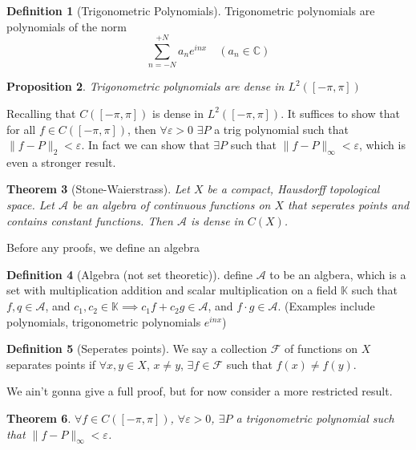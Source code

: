 \documentclass[13pt]{article}
\newtheorem{theorem}{Theorem}
\newtheorem{proposition}[theorem]{Proposition}
\theoremstyle{definition}
\newtheorem{definition}[theorem]{Definition}
\theoremstyle{remark}
\begin{document}
\begin{definition}[Trigonometric Polynomials]
    Trigonometric polynomials are polynomials of the norm 
    $$  \sum_{n=-N}^{+N} a_n e^{inx} \quad (a_n \in \mathbb{C})$$

    
\end{definition}
\begin{proposition}
    Trigonometric polynomials are dense in $L^2([-\pi,\pi])$
    
\end{proposition}
Recalling that $C([-\pi,\pi])$ is dense in $L^2([-\pi,\pi])$. It suffices to show that for all $f \in C([-\pi,\pi])$, then $\forall \varepsilon >0$ $\exists P$ a trig polynomial such that $\|f - P\|_2 < \varepsilon$. In fact we can show that $\exists P$ such that $\|f - P\|_{\infty} < \varepsilon$, which is even a stronger result. 

\begin{theorem}[Stone-Waierstrass]
    Let $X$ be a compact, Hausdorff topological space. Let $\mathcal{A}$ be an algebra of continuous functions on $X$ that seperates points and contains constant functions. Then $\mathcal{A}$ is dense in $C(X)$.

    
\end{theorem}
Before any proofs, we define an algebra
\begin{definition}[Algebra (not set theoretic)]
    define $\mathcal{A}$ to be an algbera, which is a set with multiplication addition and scalar multiplication on a field $\mathbb{K}$ such that $f, q \in \mathcal{A}$, and $c_1, c_2 \in \mathbb{K} \implies c_1 f + c_2 g \in \mathcal{A}$, and $f \cdot g \in \mathcal{A}$. (Examples include polynomials, trigonometric polynomials $e^{inx}$)
    
\end{definition}
\begin{definition}[Seperates points]
    We say a collection $\mathcal{F}$ of functions on $X$ separates points if $\forall x,y \in X$, $x \neq y$, $\exists f \in \mathcal{F}$ such that $f(x) \neq f(y)$. 
    
\end{definition}
We ain't gonna give a full proof, but for now consider a more restricted result. 
\begin{theorem}
    $\forall f \in C([-\pi,\pi])$, $\forall \varepsilon >0$, $\exists P$ a trigonometric polynomial such that $\|f - P\|_\infty < \varepsilon$. 
\end{theorem}
\end{document}
